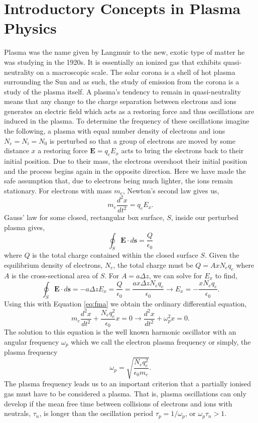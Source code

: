 \section{Introductory Concepts in Plasma Physics}
\label{sec:plasma_intro}
Plasma was the name given by Langmuir to the new, exotic type of matter he was studying in the 1920s. It is essentially an ionized gas that exhibits quasi-neutrality on a macroscopic scale. The solar corona is a shell of hot plasma surrounding the Sun and as such, the study of emission from the corona is a study of the plasma itself. A plasma's tendency to remain in quasi-neutrality means that any change to the charge separation between electrons and ions generates an electric field which acts as a restoring force and thus oscillations are induced in the plasma. To determine the frequency of these oscillations imagine the following, a plasma with equal number density of electrons and ions $N_e = N_i = N_0$ is perturbed so that a group of electrons are moved by some distance $x$ a restoring force $\mathbf{E} = q_e E_x$ acts to bring the electrons back to their initial position. Due to their mass, the electrons overshoot their initial position and the process begins again in the opposite direction. Here we have made the safe assumption that, due to electrons being much lighter, the ions remain stationary. For electrons with mass $m_e$, Newton's second law gives us,
\begin{equation}
\label{eq:fma}
m_e \frac{d^2x}{dt^2} = q_e E_x.
\end{equation}
Gauss' law for some closed, rectangular box surface, $S$, inside our perturbed plasma gives, 
$$
\oint_S \mathbf{E} \cdot d\mathbf{s} = \frac{Q}{\epsilon_0}
$$
where $Q$ is the total charge contained within the closed surface $S$. Given the equilibrium density of electrons, $N_e$, the total charge must be $Q = A x N_e q_e$ where $A$ is the cross-sectional area of $S$. For $A=a\Delta z$, we can solve for  $E_x$ to find,
$$
\oint_S \mathbf{E} \cdot d\mathbf{s} = -a \Delta z E_x =  \frac{Q}{\epsilon_0} = \frac{ax\Delta z N_e q_e}{\epsilon_0} \rightarrow E_x = -\frac{x N_e q_e}{\epsilon_0}.
$$
Using this with Equation \ref{eq:fma} we obtain the ordinary differential equation,
\begin{equation}
\label{plasma_motion}
m_e \frac{d^2 x}{dt^2} + \frac{N_e q_e^2}{\epsilon_0} x = 0 \rightarrow \frac{d^2 x}{dt^2} + \omega_p^2 x = 0.
\end{equation}
The solution to this equation is the well known harmonic oscillator with an angular frequency $\omega_p$ which we call the electron plasma frequency or simply, the plasma frequency
\begin{equation}
\label{eq:plasma_freq}
\omega_p = \sqrt{\frac{N_e q_e^2}{\epsilon_0 m_e}}.
\end{equation}
The plasma frequency leads us to an important criterion that a partially ionised gas must have to be considered a plasma. That is, plasma oscillations can only develop if the mean free time between collisions of electrons and ions with neutrals, $\tau_n$, is longer than the oscillation period $\tau_p = 1/ \omega_p$, or $\omega_p \tau_n >1$.

